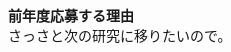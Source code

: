 \documentclass[11pt,a4j,dvipdfmx]{jarticle} 					%
\newcommand{\研究課題名}{象の卵}
\newcommand{\研究機関名}{逢坂大学}
\newcommand{\研究代表者氏名}{湯川秀樹}
\newcommand{\研究期間の最終元号年度}{7}  %
\begin{document}
\noindent
\textbf{前年度応募する理由}\\
	さっさと次の研究に移りたいので。








\end{document}
